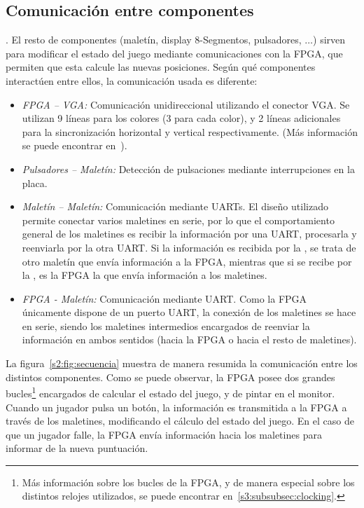 \subsection{Comunicación entre componentes}
\label{s2:subsec:comunicacion}
. El resto de componentes (maletín, display 8-Segmentos,
pulsadores, $\ldots$) sirven para modificar el estado del juego mediante
comunicaciones con la FPGA, que permiten que esta calcule las nuevas
posiciones. Según qué componentes interactúen entre ellos, la comunicación
usada es diferente:
\begin{itemize}
\item \emph{FPGA -- VGA:} Comunicación unidireccional utilizando el
  conector VGA. Se utilizan 9 líneas para los colores (3 para cada color),
  y 2 líneas adicionales para la sincronización horizontal y vertical
  respectivamente.  (Más información se
  puede encontrar en~\cite{Spartan3-StarterKit}).
\item \emph{Pulsadores -- Maletín:} Detección de pulsaciones mediante
  interrupciones en la placa.
\item \emph{Maletín -- Maletín:} Comunicación mediante UARTs. El diseño
  utilizado permite conectar varios maletines en serie, por lo que el
  comportamiento general de los maletines es recibir la información por una
  UART, procesarla y reenviarla por la otra UART. Si la información es
  recibida por la , se trata de otro maletín que envía
  información a la FPGA, mientras que si se recibe por la ,
  es la FPGA la que envía información a los maletines.
\item \emph{FPGA - Maletín:} Comunicación mediante UART. Como la FPGA
  únicamente dispone de un puerto UART, la conexión de los maletines se
  hace en serie, siendo los maletines intermedios encargados de reenviar la
  información en ambos sentidos (hacia la FPGA o hacia el resto de
  maletines).
\end{itemize}

La figura~\ref{s2:fig:secuencia} muestra de manera resumida la comunicación
entre los distintos componentes. Como se puede observar, la FPGA posee dos
grandes bucles\footnote{Más información sobre los bucles de la FPGA, y de
  manera especial sobre los distintos relojes utilizados, se puede encontrar
en~\ref{s3:subsubsec:clocking}.} encargados de calcular el estado del juego, y de pintar en
el monitor. Cuando un jugador pulsa un botón, la información es transmitida
a la FPGA a través de los maletines, modificando el cálculo del estado del
juego. En el caso de que un jugador falle, la FPGA envía información hacia
los maletines para informar de la nueva puntuación.

